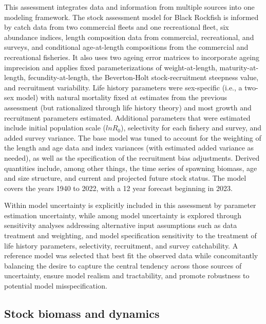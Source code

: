 \documentclass[11pt,
  letterpaper,
]{article}
\begin{document}
This assessment integrates data and information from multiple sources into one modeling framework. The stock assessment model for Black Rockfish is informed by catch data from two commercial fleets and one recreational fleet, six abundance indices, length composition data from commercial, recreational, and surveys, and conditional age-at-length compositions from the commercial and recreational fisheries. It also uses two ageing error matrices to incorporate ageing imprecision and applies fixed parameterizations of weight-at-length, maturity-at-length, fecundity-at-length, the Beverton-Holt stock-recruitment steepness value, and recruitment variability. Life history parameters were sex-specific (i.e., a two-sex model) with natural mortality fixed at estimates from the previous assessment (but rationalized through life history theory) and most growth and recruitment parameters estimated. Additional parameters that were estimated include initial population scale (\(lnR_0\)), selectivity for each fishery and survey, and added survey variance. The base model was tuned to account for the weighting of the length and age data and index variances (with estimated added variance as needed), as well as the specification of the recruitment bias adjustments. Derived quantities include, among other things, the time series of spawning biomass, age and size structure, and current and projected future stock status. The model covers the years 1940 to 2022, with a 12 year forecast beginning in 2023.

Within model uncertainty is explicitly included in this assessment by parameter estimation uncertainty, while among model uncertainty is explored through sensitivity analyses addressing alternative input assumptions such as data treatment and weighting, and model specification sensitivity to the treatment of life history parameters, selectivity, recruitment, and survey catchability. A reference model was selected that best fit the observed data while concomitantly balancing the desire to capture the central tendency across those sources of uncertainty, ensure model realism and tractability, and promote robustness to potential model misspecification.

\hypertarget{stock-biomass-and-dynamics}{%
\subsection*{Stock biomass and dynamics}\label{stock-biomass-and-dynamics}}
\end{document}
